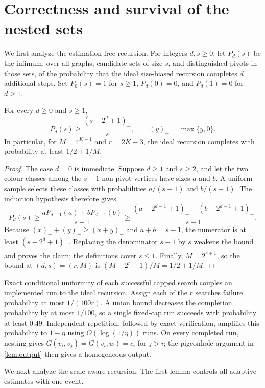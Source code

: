 \section{Correctness and survival of the nested sets}\label{sec:correctness}

We first analyze the estimation-free recursion.  For integers $d,s\ge0$, let
$P_d(s)$ be the infimum, over all graphs, candidate sets of size $s$, and
distinguished pivots in those sets, of the probability that the ideal
size-biased recursion completes $d$ additional steps.  Set $P_0(s)=1$ for
$s\ge1$, $P_d(0)=0$, and $P_d(1)=0$ for $d\ge1$.

\begin{lemma}\label{lem:size-biased-survival}
For every $d\ge0$ and $s\ge1$,
\[
 P_d(s)\ge \frac{(s-2^d+1)_+}{s},
 \qquad (y)_+=\max\{y,0\}.
\]
In particular, for $M=4^{K-1}$ and $r=2K-3$, the ideal recursion completes
with probability at least $1/2+1/M$.
\end{lemma}

\begin{proof}
The case $d=0$ is immediate.  Suppose $d\ge1$ and $s\ge2$, and let the two
colour classes among the $s-1$ non-pivot vertices have sizes $a$ and $b$.
A uniform sample selects these classes with probabilities $a/(s-1)$ and
$b/(s-1)$.  The induction hypothesis therefore gives
\[
 P_d(s)\ge
 \frac{aP_{d-1}(a)+bP_{d-1}(b)}{s-1}
 \ge
 \frac{(a-2^{d-1}+1)_+ +(b-2^{d-1}+1)_+}{s-1}.
\]
Because $(x)_++(y)_+\ge(x+y)_+$ and $a+b=s-1$, the numerator is at least
$(s-2^d+1)_+$.  Replacing the denominator $s-1$ by $s$ weakens the bound and
proves the claim; the definitions cover $s\le1$.  Finally, $M=2^{r+1}$, so
the bound at $(d,s)=(r,M)$ is
$(M-2^r+1)/M=1/2+1/M$.
\end{proof}

Exact conditional uniformity of each successful capped search couples an
implemented run to the ideal recursion.  Assign each of the $r$ searches
failure probability at most $1/(100r)$.  A union bound decreases the
completion probability by at most $1/100$, so a single fixed-cap run succeeds
with probability at least $0.49$.  Independent repetition, followed by exact
verification, amplifies this probability to $1-\eta$ using
$O(\log(1/\eta))$ runs.  On every completed run, nesting gives
$G(v_i,v_j)=G(v_i,w)=c_i$ for $j>i$; the pigeonhole argument in
\cref{lem:output} then gives a homogeneous output.

We next analyze the scale-aware recursion.  The first lemma controls all
adaptive estimates with one event.

